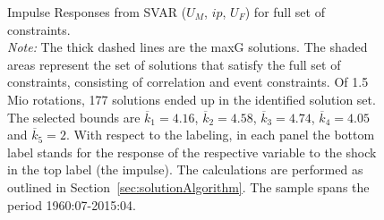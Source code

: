 \documentclass[a4paper,11pt,listof=nochaptergap,oneside,pointednumbers,bibtotoc,bigheadings,liststotoc,hidelinks]{scrbook}
\theoremstyle{mysatz}
\theoremstyle{mydefinition}
\theoremstyle{mytheorem}
\theoremstyle{mybemerkung}
\begin{document}
\begin{figure}[!h]
   \centering
   \setlength\fboxsep{0pt}
   \setlength\fboxrule{0pt}
      \caption[Impulse Respones from SVAR ($U_{M}$, $ip$, $U_{F}$) for full set of constraints.]{Impulse Responses from SVAR ($U_{M}$, $ip$, $U_{F}$) for full set of constraints.\\
      \textit{Note:}  The thick dashed lines are the maxG solutions. The shaded areas represent the set of solutions that satisfy the full set of constraints, consisting of correlation and event constraints. Of 1.5 Mio rotations, 177 solutions ended up in the identified solution set. The selected bounds are $\overline{k}_1 = 4.16$, $\overline{k}_2 = 4.58$, $\overline{k}_3 = 4.74$, $\overline{k}_4 = 4.05$ and $\overline{k}_5 = 2$. With respect to the labeling, in each panel the bottom label stands for the response of the respective variable to the shock in the top label (the impulse). The calculations are performed as outlined in Section~\ref{sec:solutionAlgorithm}. The sample spans the period 1960:07-2015:04.}   \label{fig:impulse.responses_all.SVAR}
\end{figure}
\end{document}
